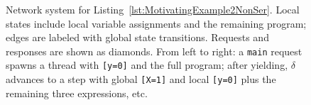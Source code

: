 \begin{figure}[!htbp]
	\caption{Network system for Listing~\ref{lst:MotivatingExample2NonSer}. 
		Local states include local variable assignments and the remaining program; edges are labeled with global state transitions. 
		Requests and responses are shown as diamonds. 
		From left to right: a \texttt{main} request spawns a thread with \texttt{[y=0]} and the full program; after yielding, $\delta$ advances to a step with global \texttt{[X=1]} and local \texttt{[y=0]} plus the remaining three expressions, etc.}

\label{fig:code2ExampleNS}
\end{figure}


